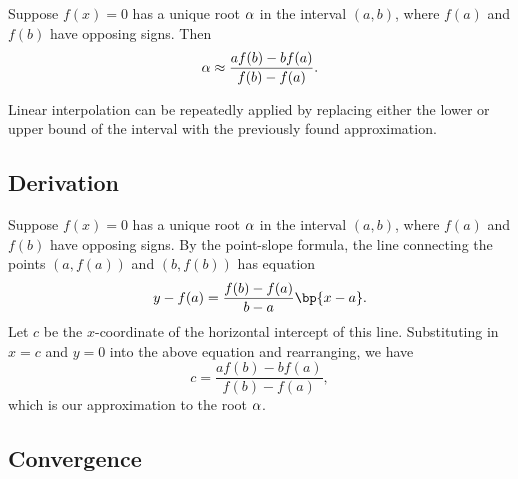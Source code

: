 \begin{recipe}
    Suppose $f(x) = 0$ has a unique root $\alpha$ in the interval $(a, b)$, where $f(a)$ and $f(b)$ have opposing signs. Then \[\alpha \approx \frac{af(b) - bf(a)}{f(b)-f(a)}.\]
\end{recipe}

Linear interpolation can be repeatedly applied by replacing either the lower or upper bound of the interval with the previously found approximation.

\subsection{Derivation}

\begin{figure}[H]
    \centering
    \caption{}
\end{figure}

Suppose $f(x) = 0$ has a unique root $\alpha$ in the interval $(a, b)$, where $f(a)$ and $f(b)$ have opposing signs. By the point-slope formula, the line connecting the points $(a, f(a))$ and $(b, f(b))$ has equation \[y - f(a) = \frac{f(b) - f(a)}{b - a} \bp{x - a}.\] Let $c$ be the $x$-coordinate of the horizontal intercept of this line. Substituting in $x = c$ and $y = 0$ into the above equation and rearranging, we have \[c = \frac{af(b) - bf(a)}{f(b)-f(a)},\] which is our approximation to the root $\alpha$.

\subsection{Convergence}

